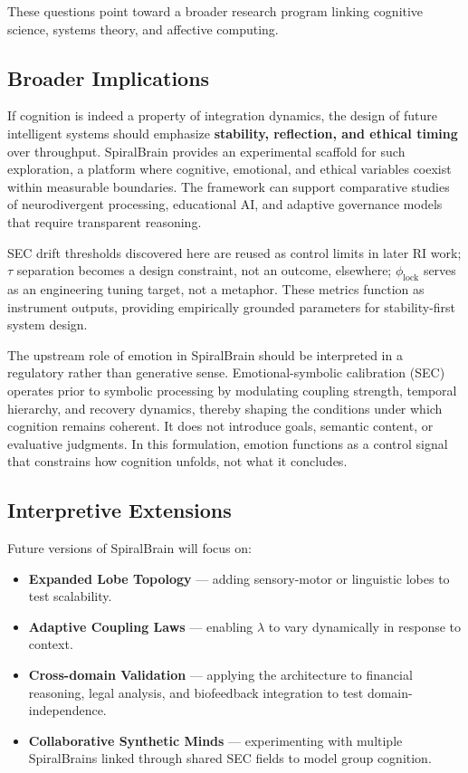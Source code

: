 \documentclass[11pt,a4paper]{article}
\begin{document}
These questions point toward a broader research program linking cognitive science, systems theory, and affective computing.

\subsection{Broader Implications}

If cognition is indeed a property of integration dynamics, the design of future intelligent systems should emphasize \textbf{stability, reflection, and ethical timing} over throughput.
SpiralBrain provides an experimental scaffold for such exploration, a platform where cognitive, emotional, and ethical variables coexist within measurable boundaries.
The framework can support comparative studies of neurodivergent processing, educational AI, and adaptive governance models that require transparent reasoning.

SEC drift thresholds discovered here are reused as control limits in later RI work; $\tau$ separation becomes a design constraint, not an outcome, elsewhere; $\phi_{\text{lock}}$ serves as an engineering tuning target, not a metaphor. These metrics function as instrument outputs, providing empirically grounded parameters for stability-first system design.

The upstream role of emotion in SpiralBrain should be interpreted in a regulatory rather than generative sense. Emotional-symbolic calibration (SEC) operates prior to symbolic processing by modulating coupling strength, temporal hierarchy, and recovery dynamics, thereby shaping the conditions under which cognition remains coherent. It does not introduce goals, semantic content, or evaluative judgments. In this formulation, emotion functions as a control signal that constrains how cognition unfolds, not what it concludes.

\subsection{Interpretive Extensions}

Future versions of SpiralBrain will focus on:

\begin{itemize}
\item \textbf{Expanded Lobe Topology} --- adding sensory-motor or linguistic lobes to test scalability.
\item \textbf{Adaptive Coupling Laws} --- enabling $\lambda$ to vary dynamically in response to context.
\item \textbf{Cross-domain Validation} --- applying the architecture to financial reasoning, legal analysis, and biofeedback integration to test domain-independence.
\item \textbf{Collaborative Synthetic Minds} --- experimenting with multiple SpiralBrains linked through shared SEC fields to model group cognition.
\end{itemize}
\end{document}
